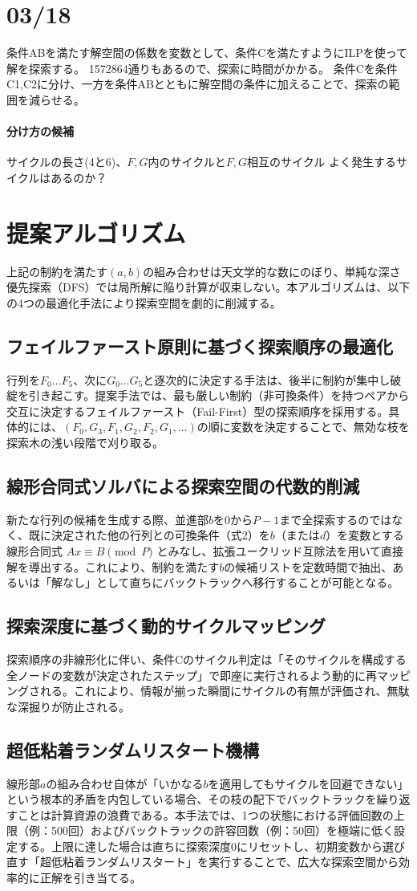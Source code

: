 \documentclass[a4paper,11pt,dvipdfmx]{jsarticle}
\theoremstyle{definition}
\begin{document}
\section{03/18}
条件ABを満たす解空間の係数を変数として、条件Cを満たすようにILPを使って解を探索する。
1572864通りもあるので、探索に時間がかかる。
条件Cを条件C1,C2に分け、一方を条件ABとともに解空間の条件に加えることで、探索の範囲を減らせる。

\paragraph{分け方の候補}
サイクルの長さ(4と6)、$F,G$内のサイクルと$F,G$相互のサイクル
よく発生するサイクルはあるのか？

\section{提案アルゴリズム}
上記の制約を満たす$(a,b)$の組み合わせは天文学的な数にのぼり、単純な深さ優先探索（DFS）では局所解に陥り計算が収束しない。本アルゴリズムは、以下の4つの最適化手法により探索空間を劇的に削減する。

\subsection{フェイルファースト原則に基づく探索順序の最適化}
行列を$F_0 \dots F_5$、次に$G_0 \dots G_5$と逐次的に決定する手法は、後半に制約が集中し破綻を引き起こす。提案手法では、最も厳しい制約（非可換条件）を持つペアから交互に決定するフェイルファースト（Fail-First）型の探索順序を採用する。具体的には、$(F_0, G_3, F_1, G_2, F_2, G_1, \dots)$の順に変数を決定することで、無効な枝を探索木の浅い段階で刈り取る。

\subsection{線形合同式ソルバによる探索空間の代数的削減}
新たな行列の候補を生成する際、並進部$b$を$0$から$P-1$まで全探索するのではなく、既に決定された他の行列との可換条件（式2）を$b$（または$d$）を変数とする線形合同式 $Ax \equiv B \pmod P$ とみなし、拡張ユークリッド互除法を用いて直接解を導出する。これにより、制約を満たす$b$の候補リストを定数時間で抽出、あるいは「解なし」として直ちにバックトラックへ移行することが可能となる。

\subsection{探索深度に基づく動的サイクルマッピング}
探索順序の非線形化に伴い、条件Cのサイクル判定は「そのサイクルを構成する全ノードの変数が決定されたステップ」で即座に実行されるよう動的に再マッピングされる。これにより、情報が揃った瞬間にサイクルの有無が評価され、無駄な深掘りが防止される。

\subsection{超低粘着ランダムリスタート機構}
線形部$a$の組み合わせ自体が「いかなる$b$を適用してもサイクルを回避できない」という根本的矛盾を内包している場合、その枝の配下でバックトラックを繰り返すことは計算資源の浪費である。本手法では、1つの状態における評価回数の上限（例：500回）およびバックトラックの許容回数（例：50回）を極端に低く設定する。上限に達した場合は直ちに探索深度0にリセットし、初期変数から選び直す「超低粘着ランダムリスタート」を実行することで、広大な探索空間から効率的に正解を引き当てる。
\end{document}
